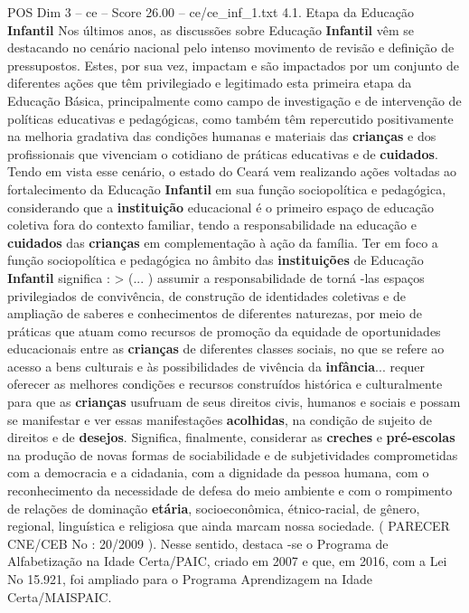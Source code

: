 \begin{textsample}{POS Dim 3 – ce – Score 26.00 – ce/ce\_inf\_1.txt}  \label{ex:f3_pos_055}
4.1.
Etapa da Educação \textbf{Infantil} Nos últimos anos, as discussões sobre Educação \textbf{Infantil} vêm se destacando no cenário nacional pelo intenso movimento de revisão e definição de pressupostos.
Estes, por sua vez, impactam e são impactados por um conjunto de diferentes ações que têm privilegiado e legitimado esta primeira etapa da Educação Básica, principalmente como campo de investigação e de intervenção de políticas educativas e pedagógicas, como também têm repercutido positivamente na melhoria gradativa das condições humanas e materiais das \textbf{crianças} e dos profissionais que vivenciam o cotidiano de práticas educativas e de \textbf{cuidados}.
Tendo em vista esse cenário, o estado do Ceará vem realizando ações voltadas ao fortalecimento da Educação \textbf{Infantil} em sua função sociopolítica e pedagógica, considerando que a \textbf{instituição} educacional é o primeiro espaço de educação coletiva fora do contexto familiar, tendo a responsabilidade na educação e \textbf{cuidados} das \textbf{crianças} em complementação à ação da família.
Ter em foco a função sociopolítica e pedagógica no âmbito das \textbf{instituições} de Educação \textbf{Infantil} significa : > (... ) assumir a responsabilidade de torná -las espaços privilegiados de convivência, de construção de identidades coletivas e de ampliação de saberes e conhecimentos de diferentes naturezas, por meio de práticas que atuam como recursos de promoção da equidade de oportunidades educacionais entre as \textbf{crianças} de diferentes classes sociais, no que se refere ao acesso a bens culturais e às possibilidades de vivência da \textbf{infância}... requer oferecer as melhores condições e recursos construídos histórica e culturalmente para que as \textbf{crianças} usufruam de seus direitos civis, humanos e sociais e possam se manifestar e ver essas manifestações \textbf{acolhidas}, na condição de sujeito de direitos e de \textbf{desejos}.
Significa, finalmente, considerar as \textbf{creches} e \textbf{pré-escolas} na produção de novas formas de sociabilidade e de subjetividades comprometidas com a democracia e a cidadania, com a dignidade da pessoa humana, com o reconhecimento da necessidade de defesa do meio ambiente e com o rompimento de relações de dominação \textbf{etária}, socioeconômica, étnico-racial, de gênero, regional, linguística e religiosa que ainda marcam nossa sociedade. ( PARECER CNE/CEB No : 20/2009 ).
Nesse sentido, destaca -se o Programa de Alfabetização na Idade Certa/PAIC, criado em 2007 e que, em 2016, com a Lei No 15.921, foi ampliado para o Programa Aprendizagem na Idade Certa/MAISPAIC.

\end{textsample}
